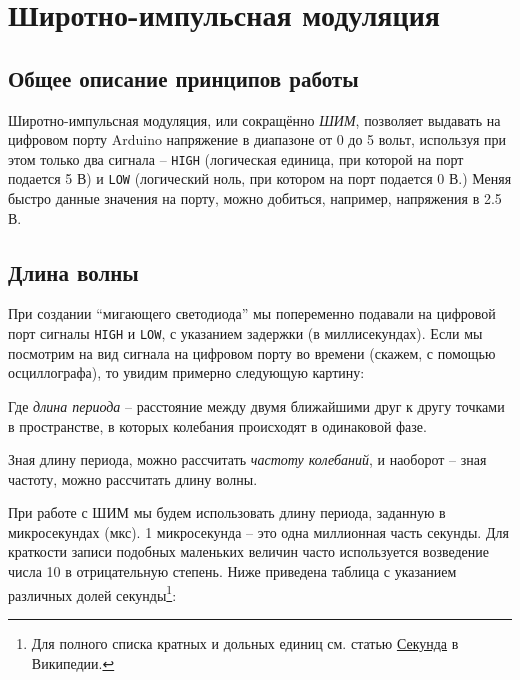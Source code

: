 \documentclass[a4paper,twoside]{book}
\begin{document}
\chapter{Широтно-импульсная модуляция}

\section{Общее описание принципов работы}

Широтно-импульсная модуляция, или сокращённо \emph{ШИМ}, позволяет выдавать на
цифровом порту Arduino напряжение в диапазоне от 0 до 5 вольт, используя при
этом только два сигнала -- \texttt{HIGH} (логическая единица, при которой на
порт подается 5 В) и \texttt{LOW} (логический ноль, при котором на порт подается
0 В.) Меняя быстро данные значения на порту, можно добиться, например,
напряжения в 2.5 В.

\section{Длина волны}

При создании ``мигающего светодиода'' мы попеременно подавали на цифровой порт
сигналы \texttt{HIGH} и \texttt{LOW}, с указанием задержки (в миллисекундах).
Если мы посмотрим на вид сигнала на цифровом порту во времени (скажем, с помощью
осциллографа), то увидим примерно следующую картину:


Где \emph{длина периода} -- расстояние между двумя ближайшими друг к другу
точками в пространстве, в которых колебания происходят в одинаковой фазе.

Зная длину периода, можно рассчитать \emph{частоту колебаний}, и наоборот --
зная частоту, можно рассчитать длину волны.

При работе с ШИМ мы будем использовать длину периода, заданную в микросекундах
(мкс). 1 микросекунда -- это одна миллионная часть секунды. Для краткости записи
подобных маленьких величин часто используется возведение числа 10 в
отрицательную степень. Ниже приведена таблица с указанием различных долей
секунды\footnote{Для полного списка кратных и дольных единиц см. статью
\href{https://ru.wikipedia.org/wiki/\%D0\%A1\%D0\%B5\%D0\%BA\%D1\%83\%D0\%BD\%D0\%B4\%D0\%B0}{Секунда}
в Википедии.}:
\end{document}
